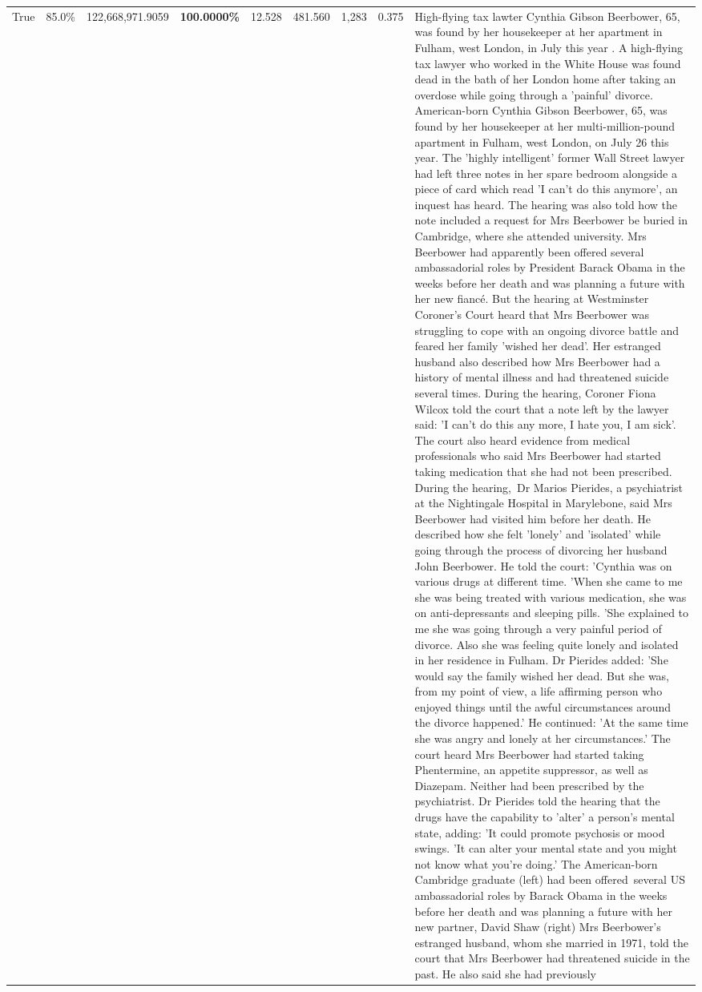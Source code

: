 \begin{table}[H]
\begin{tabular}{lllrlllll}
\cline{1-9}
True & 85.0\% & 122,668,971.9059 & \bfseries \color{red} 100.0000\% & 12.528 & 481.560 & 1,283 & 0.375 & High-flying tax lawter Cynthia Gibson Beerbower, 65, was found by her housekeeper at her apartment in Fulham, west London, in July this year . A high-flying tax lawyer who worked in the White House was found dead in the bath of her London home after taking an overdose while going through a 'painful' divorce. American-born Cynthia Gibson Beerbower, 65, was found by her housekeeper at her multi-million-pound apartment in Fulham, west London, on July 26 this year. The 'highly intelligent' former Wall Street lawyer had left three notes in her spare bedroom alongside a piece of card which read 'I can't do this anymore', an inquest has heard. The hearing was also told how the note included a request for Mrs Beerbower be buried in Cambridge, where she attended university. Mrs Beerbower had apparently been offered several ambassadorial roles by President Barack Obama in the weeks before her death and was planning a future with her new fiancé. But the hearing at Westminster Coroner's Court heard that Mrs Beerbower was struggling to cope with an ongoing divorce battle and feared her family 'wished her dead'. Her estranged husband also described how Mrs Beerbower had a history of mental illness and had threatened suicide several times. During the hearing, Coroner Fiona Wilcox told the court that a note left by the lawyer said: 'I can't do this any more, I hate you, I am sick'. The court also heard evidence from medical professionals who said Mrs Beerbower had started taking medication that she had not been prescribed. During the hearing, Dr Marios Pierides, a psychiatrist at the Nightingale Hospital in Marylebone, said Mrs Beerbower had visited him before her death. He described how she felt 'lonely' and 'isolated' while going through the process of divorcing her husband John Beerbower. He told the court: 'Cynthia was on various drugs at different time. 'When she came to me she was being treated with various medication, she was on anti-depressants and sleeping pills. 'She explained to me she was going through a very painful period of divorce. Also she was feeling quite lonely and isolated in her residence in Fulham. Dr Pierides added: 'She would say the family wished her dead. But she was, from my point of view, a life affirming person who enjoyed things until the awful circumstances around the divorce happened.' He continued: 'At the same time she was angry and lonely at her circumstances.' The court heard Mrs Beerbower had started taking Phentermine, an appetite suppressor, as well as Diazepam. Neither had been prescribed by the psychiatrist. Dr Pierides told the hearing that the drugs have the capability to 'alter' a person's mental state, adding: 'It could promote psychosis or mood swings. 'It can alter your mental state and you might not know what you're doing.' The American-born Cambridge graduate (left) had been offered several US ambassadorial roles by Barack Obama in the weeks before her death and was planning a future with her new partner, David Shaw (right) Mrs Beerbower's estranged husband, whom she married in 1971, told the court that Mrs Beerbower had threatened suicide in the past. He also said she had previously 
\end{tabular}
\end{table}
